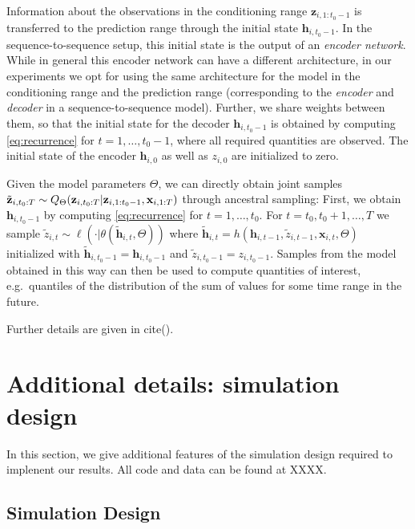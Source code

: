 \documentclass{article}
\newcommand{\z}[2]{z_{#1, #2}}
\newcommand{\xbf}{\mathbf{x}}
\newcommand{\zVec}[3]{\mathbf{z}_{#1, #2:#3}}
\newcommand{\hVec}{\mathbf{h}}
\begin{document}
Information about the observations in the conditioning range $\zVec{i}{1}{t_0 -1}$ is transferred to the prediction range through the initial state $\hVec_{i, t_0-1}$. In the sequence-to-sequence setup, this initial state is the output of an \emph{encoder network}. While in general this encoder network can have a different architecture, in our 
experiments we opt for using the same architecture for the model in the conditioning range and the prediction range (corresponding to the \emph{encoder} and \emph{decoder} in
a sequence-to-sequence model). Further, we share weights between them, so that the initial state
for the decoder $\hVec_{i, t_0 - 1}$ is obtained by computing \eqref{eq:recurrence} for $t = 1, \ldots, t_0 - 1$, where all required quantities are observed. The initial state of the encoder $\hVec_{i, 0}$ as well as $\z{i}{0}$ are initialized to zero.

Given the model parameters $\Theta$, we can directly obtain joint samples $\tilde{\mathbf{z}}_{i, t_0:T} \sim \modelDist$ through ancestral sampling:
First, we obtain $\hVec_{i, t_0-1}$ by computing \eqref{eq:recurrence} for $t=1,\ldots, t_0$.
For $t=t_0, t_0+1, \ldots, T$ we sample $\tilde{z}_{i, t} \sim \ell(\cdot | \theta(\tilde{\mathbf{h}}_{i,t}, \Theta))$
where $\tilde{\mathbf{h}}_{i, t} = h\left(\hVec_{i, t-1}, \tilde{z}_{i, t-1}, \xbf_{i, t}, \Theta\right)$
initialized with $\tilde{\mathbf{h}}_{i, t_0-1} = \hVec_{i, t_0-1}$ and $\tilde{z}_{i, t_0 -1} = \z{i}{t_0 - 1}$.
Samples from the model obtained in this way can then be used to compute quantities
of interest, e.g.\ quantiles of the distribution of the sum of values for some
time range in the future.

Further details are given in cite().

\appendix

\newpage

\section{Additional details: simulation design}
In this section, we give additional features of the simulation design required to implenent our results. All code and data can be found at XXXX. 

\subsection{Simulation Design}
\end{document}
